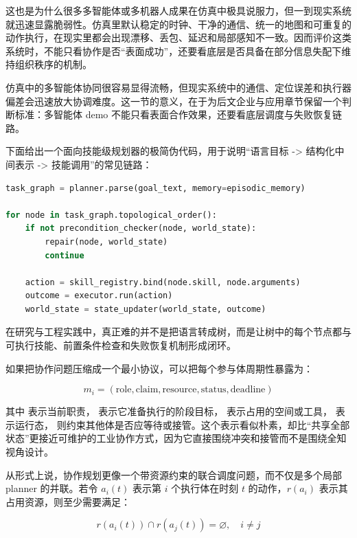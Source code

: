 这也是为什么很多多智能体或多机器人成果在仿真中极具说服力，但一到现实系统就迅速显露脆弱性。仿真里默认稳定的时钟、干净的通信、统一的地图和可重复的动作执行，在现实里都会出现漂移、丢包、延迟和局部感知不一致。因而评价这类系统时，不能只看协作是否“表面成功”，还要看底层是否具备在部分信息失配下维持组织秩序的机制。

仿真中的多智能体协同很容易显得流畅，但现实系统中的通信、定位误差和执行器偏差会迅速放大协调难度。这一节的意义，在于为后文企业与应用章节保留一个判断标准：多智能体 demo 不能只看表面合作效果，还要看底层调度与失败恢复链路。

下面给出一个面向技能级规划器的极简伪代码，用于说明“语言目标 -> 结构化中间表示 -> 技能调用”的常见链路：

\begin{lstlisting}[language=python]
task_graph = planner.parse(goal_text, memory=episodic_memory)

for node in task_graph.topological_order():
    if not precondition_checker(node, world_state):
        repair(node, world_state)
        continue

    action = skill_registry.bind(node.skill, node.arguments)
    outcome = executor.run(action)
    world_state = state_updater(world_state, outcome)
\end{lstlisting}

在研究与工程实践中，真正难的并不是把语言转成树，而是让树中的每个节点都与可执行技能、前置条件检查和失败恢复机制形成闭环。

如果把协作问题压缩成一个最小协议，可以把每个参与体周期性暴露为：

\begingroup
\footnotesize
\begin{equation*}
m_i = (\text{role}, \text{claim}, \text{resource}, \text{status}, \text{deadline})
\end{equation*}
\endgroup

其中 \texttt{} 表示当前职责，\texttt{} 表示它准备执行的阶段目标，\texttt{} 表示占用的空间或工具，\texttt{} 表示运行态，\texttt{} 则约束其他体是否应等待或接管。这个表示看似朴素，却比“共享全部状态”更接近可维护的工业协作方式，因为它直接围绕冲突和接管而不是围绕全知视角设计。

从形式上说，协作规划更像一个带资源约束的联合调度问题，而不仅是多个局部 planner 的并联。若令 \(a_i(t)\) 表示第 \(i\) 个执行体在时刻 \(t\) 的动作，\(r(a_i)\) 表示其占用资源，则至少需要满足：

\begin{equation*}
r(a_i(t)) \cap r(a_j(t)) = \varnothing,\quad i \neq j
\end{equation*}

